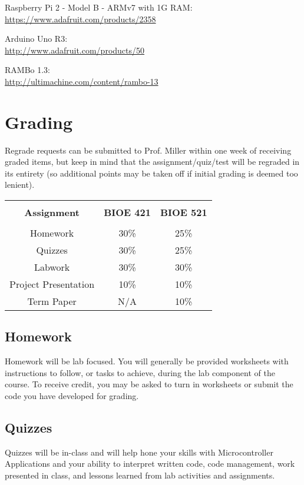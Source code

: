 \documentclass[10pt]{article}
\begin{document}
Raspberry Pi 2 - Model B - ARMv7 with 1G RAM:\\
\href{https://www.adafruit.com/products/2358}{https://www.adafruit.com/products/2358}

Arduino Uno R3:\\
\href{http://www.adafruit.com/products/50}{http://www.adafruit.com/products/50}

RAMBo 1.3:\\
\href{http://ultimachine.com/content/rambo-13}{http://ultimachine.com/content/rambo-13}


\section*{Grading}

Regrade requests can be submitted to Prof. Miller within one week of receiving graded items, but keep in mind that the assignment/quiz/test will be regraded in its entirety (so additional points may be taken off if initial grading is deemed too lenient).

\begin{table}[ht]
\begin{tabular}{c c c}
\hline\hline
\\[-1ex]
\textbf{Assignment} & \textbf{BIOE 421} & \textbf{BIOE 521} \\ [0.5ex]
\hline
\\[-1ex]
Homework				&	30\%	&	25\%	\\[1ex]
Quizzes				&	30\%	&	25\%	\\[1ex]
Labwork					&	30\%	&	30\%	\\[1ex]
Project Presentation	&	10\%	&	10\%	\\[1ex]
Term Paper				&	N/A		&	10\%	\\ [1ex]\hline
\end{tabular}
\label{table:nonlin}
\end{table}


\subsection*{Homework}
Homework will be lab focused. You will generally be provided worksheets with instructions to follow, or tasks to achieve, during the lab component of the course. To receive credit, you may be asked to turn in worksheets or submit the code you have developed for grading.

\subsection*{Quizzes}
Quizzes will be in-class and will help hone your skills with Microcontroller Applications and your ability to interpret written code, code management, work presented in class, and lessons learned from lab activities and assignments.
\end{document}
